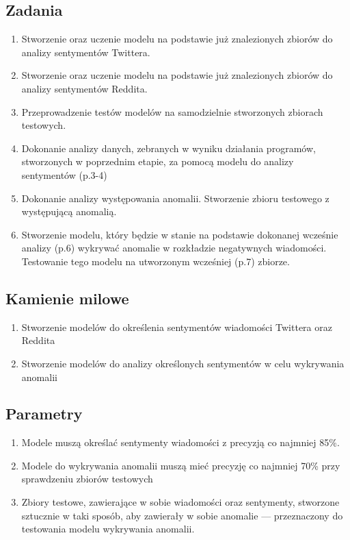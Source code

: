 \documentclass[a4paper,11pt, notitlepage ]{article}
\begin{document}
\subsection{Zadania}
\begin{enumerate}
    \item Stworzenie oraz uczenie modelu na podstawie już znalezionych zbiorów do analizy sentymentów Twittera.
    \item Stworzenie oraz uczenie modelu na podstawie już znalezionych zbiorów do analizy sentymentów Reddita.
    \item Przeprowadzenie testów modelów na samodzielnie stworzonych zbiorach testowych.
    \item Dokonanie analizy danych, zebranych w wyniku działania programów, stworzonych w poprzednim etapie, za pomocą modelu do analizy sentymentów (p.3-4)
    \item Dokonanie analizy występowania anomalii. Stworzenie zbioru testowego z występującą anomalią.
    \item Stworzenie modelu, który będzie w stanie na podstawie dokonanej wcześnie analizy (p.6) wykrywać anomalie w rozkładzie negatywnych wiadomości. Testowanie tego modelu na utworzonym wcześniej (p.7) zbiorze.
\end{enumerate}

\subsection{Kamienie milowe}
\begin{enumerate}
    \item Stworzenie modelów do określenia sentymentów wiadomości Twittera oraz Reddita
    \item Stworzenie modelów do analizy określonych sentymentów w celu wykrywania anomalii
\end{enumerate}

\subsection{Parametry}
\begin{enumerate}
    \item Modele muszą określać sentymenty wiadomości z precyzją co najmniej 85\%.
    \item Modele do wykrywania anomalii muszą mieć precyzję co najmniej 70\% przy sprawdzeniu zbiorów testowych
    \item Zbiory testowe, zawierające w sobie wiadomości oraz sentymenty, stworzone sztucznie w taki sposób, aby zawierały w sobie anomalie — przeznaczony do testowania modelu wykrywania anomalii.
\end{enumerate}
\end{document}
